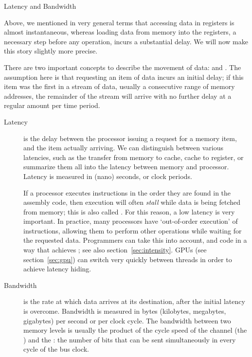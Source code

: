  {Latency and Bandwidth}
\label{sec:latencybandwidth}

Above, we mentioned in very general terms that accessing data in
registers is almost instantaneous, whereas loading data from memory
into the registers, a necessary step before any operation, incurs a
substantial delay. We will now make this story slightly more precise.

There are two important concepts to describe the movement of data:
 and . The assumption here is
that requesting an item of data incurs an initial delay; if this item
was the first in a stream of data, usually a consecutive range of
memory addresses, the remainder of the stream will arrive with no
further delay
at a regular amount per time period.
\begin{description}
\item[Latency] is the delay between the processor issuing a request
  for a memory item, and the item actually arriving. We can
  distinguish between various latencies, such as the transfer from
  memory to cache, cache to register, or summarize them all into the
  latency between memory and processor. Latency is measured in (nano)
  seconds, or clock periods.

  If a processor executes instructions in the order they are found in
  the assembly code, then execution will often \emph{stall} while
  data is being fetched from memory; this is also called
  . For this reason, a low latency is very
  important. In practice, many processors have `out-of-order
  execution' of instructions, allowing them to perform other
  operations while waiting for the requested data. Programmers can
  take this into account, and code in a way that achieves
  ; see also section~\ref{sec:intensity}.
  \acp{GPU} (see section~\ref{sec:gpu})  
  can switch very quickly between threads in order to achieve latency hiding.
\item[Bandwidth] is the rate at which data arrives at its destination,
  after the initial latency is overcome. Bandwidth is measured in
  bytes (kilobytes, megabytes, gigabytes) per second or per clock cycle.
  The bandwidth between two memory levels is usually the product of
  the cycle speed of the channel (the ) and
  the : the number of bits that can be sent
  simultaneously in every cycle of the bus clock.
\end{description}

